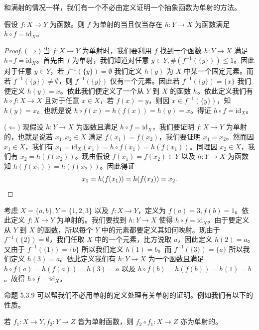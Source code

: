 和满射的情况一样，我们有一个不必由定义证明一个抽象函数为单射的方法。

\begin{proposition}
假设 $f : X \to Y$ 为函数。则 $f$ 为单射的当且仅当存在 $h : Y \to X$ 为函数满足 $h \circ f = \mathrm{id}_X$。
\end{proposition}

\begin{proof}
($\Rightarrow$) 当 $f : X \to Y$ 为单射时，我们要利用 $f$ 找到一个函数 $h : Y \to X$ 满足 $h \circ f = \mathrm{id}_X$。首先由 $f$ 为单射，我们知道对任意 $y \in Y, \#(f^{-1}(\{y\})) \leq 1$。因此对于任意 $y \in Y$，若 $f^{-1}(\{y\}) = \emptyset$ 我们定义 $h(y)$ 为 $X$ 中某一个固定元素。而若 $f^{-1}(\{y\}) \neq \emptyset$，则 $f^{-1}(\{y\})$ 仅有一个元素。因此若 $f^{-1}(\{y\}) = \{x\}$ 我们便定义 $h(y) = x$。依此我们便定义了一个从 $Y$ 到 $X$ 的函数 $h$。依此定义我们有 $h \circ f : X \to X$ 且对于任意 $x \in X$，若 $f(x) = y$，则因 $x \in f^{-1}(\{y\})$，知 $h(y) = x$。也就是说 $h \circ f(x) = h(f(x)) = h(y) = x$。得证 $h \circ f = \mathrm{id}_X$。

($\Leftarrow$) 现假设 $h : Y \to X$ 为函数且满足 $h \circ f = \mathrm{id}_X$，我们要证明 $f : X \to Y$ 为单射的，也就是说若 $x_1, x_2 \in X$ 满足 $f(x_1) = f(x_2)$，我们要证明 $x_1 = x_2$。然而因 $x_1 \in X$，我们有 $x_1 = \mathrm{id}_X(x_1) = h \circ f(x_1) = h(f(x_1))$。同理因 $x_2 \in X$，我们有 $x_2 = h(f(x_2))$。现由假设 $f(x_1) = f(x_2) \in Y$ 以及 $h : Y \to X$ 为函数知 $h(f(x_1)) = h(f(x_2))$。因此得证
\[x_1 = h(f(x_1)) = h(f(x_2)) = x_2. \qedhere\]
\end{proof}

\begin{example}
考虑 $X = \{a, b\}, Y = \{1, 2, 3\}$ 以及 $f : X \to Y$，定义为 $f(a) = 3, f(b) = 1$。依此定义 $f : X \to Y$ 为单射的。我们要找到 $h : Y \to X$ 使得 $h \circ f = \mathrm{id}_X$。由于要定义从 $Y$ 到 $X$ 的函数，所以每个 $Y$ 中的元素都要定义其如何映射。现由于 $f^{-1}(\{2\}) = \emptyset$，我们任取 $X$ 中的一个元素，比方说取 $a$，因此定义 $h(2) = a$。又由于 $f^{-1}(\{1\}) = \{b\}$ 所以我们定义 $h(1) = b$。而 $f^{-1}(\{3\}) = \{a\}$ 所以我们定义 $h(3) = a$。依此定义我们有 $h : Y \to X$ 为一个函数且满足 $h \circ f(a) = h(f(a)) = h(3) = a$ 以及 $h \circ f(b) = h(f(b)) = h(1) = b$。故得 $h \circ f = \mathrm{id}_X$。
\end{example}

命题 5.3.9 可以帮我们不必用单射的定义处理有关单射的证明。例如我们有以下的性质。

\begin{proposition}
若 $f_1 : X \to Y, f_2 : Y \to Z$ 皆为单射函数，则 $f_2 \circ f_1 : X \to Z$ 亦为单射的。
\end{proposition}

